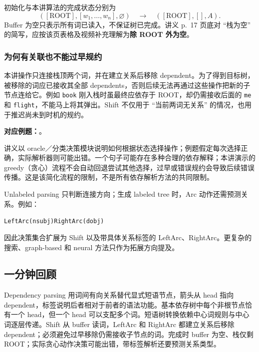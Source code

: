 初始化与本讲算法的完成状态分别为
\[
  ([\mathrm{ROOT}],[w_1,\ldots,w_n],\varnothing)
  \quad\longrightarrow\quad
  ([\mathrm{ROOT}],[],A).
\]
Buffer 为空只表示所有词已读入，不保证树已完成。讲义 p.~17 页底对 ``栈为空'' 的简写，应按该页表格及视频补充理解为\textbf{除 ROOT 外为空}。

\subsubsection{为何有关联也不能过早规约}

本讲操作只连接栈顶两个词，并在建立关系后移除 dependent。为了得到目标树，被移除的词应已接收其全部 dependents，否则后续无法再通过这些操作把新的子节点连给它。例如 \texttt{book} 刚入栈时虽最终应依存于 ROOT，却仍需接收后面的 \texttt{me} 和 \texttt{flight}，不能马上将其弹出。Shift 不仅用于 ``当前两词无关系'' 的情况，也用于推迟尚未到时机的规约。

\textbf{对应例题：}。


讲义以 oracle／分类决策模块说明如何根据状态选择操作；例题假定每次选择正确，实际解析器则可能出错。一个句子可能存在多种合理的依存解释；本讲演示的 greedy（贪心）流程不会自动回退尝试其他选择，过早或错误规约会导致后续错误传播。这是该简化流程的限制，不是所有依存解析方法的共同限制。

Unlabeled parsing 只判断连接方向；生成 labeled tree 时，Arc 动作还需预测关系。例如：
\begin{center}
\texttt{LeftArc(nsubj)}\qquad\texttt{RightArc(dobj)}
\end{center}
因此决策集合扩展为 Shift 以及带具体关系标签的 LeftArc、RightArc。更复杂的搜索、graph-based 和 neural 方法只作为拓展方向提及。

\subsection{一分钟回顾}

Dependency parsing 用词间有向关系替代显式短语节点，箭头从 head 指向 dependent，标签说明后者相对于前者的语法功能。基本依存树中每个非根节点恰有一个 head，但一个 head 可以支配多个词。短语树转换依赖中心词规则与中心词逐层传递。Shift 从 buffer 读词，LeftArc 和 RightArc 都建立关系后移除 dependent；必须避免过早移除仍需接收子节点的词。完成时 buffer 为空、栈仅剩 ROOT；实际贪心动作决策可能出错，带标签解析还要预测关系类型。
